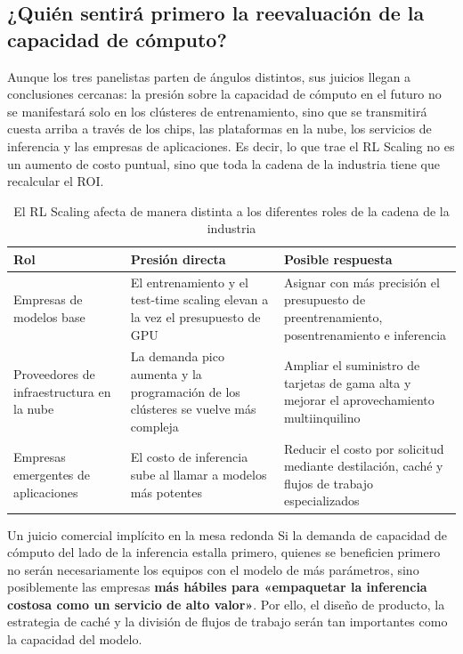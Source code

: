 \documentclass[a4paper]{article}
\begin{document}
\subsection{¿Quién sentirá primero la reevaluación de la capacidad de cómputo?}
Aunque los tres panelistas parten de ángulos distintos, sus juicios llegan a conclusiones cercanas: la presión sobre la capacidad de cómputo en el futuro no se manifestará solo en los clústeres de entrenamiento, sino que se transmitirá cuesta arriba a través de los chips, las plataformas en la nube, los servicios de inferencia y las empresas de aplicaciones. Es decir, lo que trae el RL Scaling no es un aumento de costo puntual, sino que toda la cadena de la industria tiene que recalcular el ROI.

\begin{table}[H]
\centering
\begin{tabular}{p{3.2cm}p{5.2cm}p{5cm}}
\toprule
Rol & Presión directa & Posible respuesta \\
\midrule
Empresas de modelos base & El entrenamiento y el test-time scaling elevan a la vez el presupuesto de GPU & Asignar con más precisión el presupuesto de preentrenamiento, posentrenamiento e inferencia \\
Proveedores de infraestructura en la nube & La demanda pico aumenta y la programación de los clústeres se vuelve más compleja & Ampliar el suministro de tarjetas de gama alta y mejorar el aprovechamiento multiinquilino \\
Empresas emergentes de aplicaciones & El costo de inferencia sube al llamar a modelos más potentes & Reducir el costo por solicitud mediante destilación, caché y flujos de trabajo especializados \\
\bottomrule
\end{tabular}
\caption{El RL Scaling afecta de manera distinta a los diferentes roles de la cadena de la industria}
\end{table}

\begin{knowledgebox}{Un juicio comercial implícito en la mesa redonda}
Si la demanda de capacidad de cómputo del lado de la inferencia estalla primero, quienes se beneficien primero no serán necesariamente los equipos con el modelo de más parámetros, sino posiblemente las empresas \textbf{más hábiles para «empaquetar la inferencia costosa como un servicio de alto valor»}. Por ello, el diseño de producto, la estrategia de caché y la división de flujos de trabajo serán tan importantes como la capacidad del modelo.
\end{knowledgebox}
\end{document}
